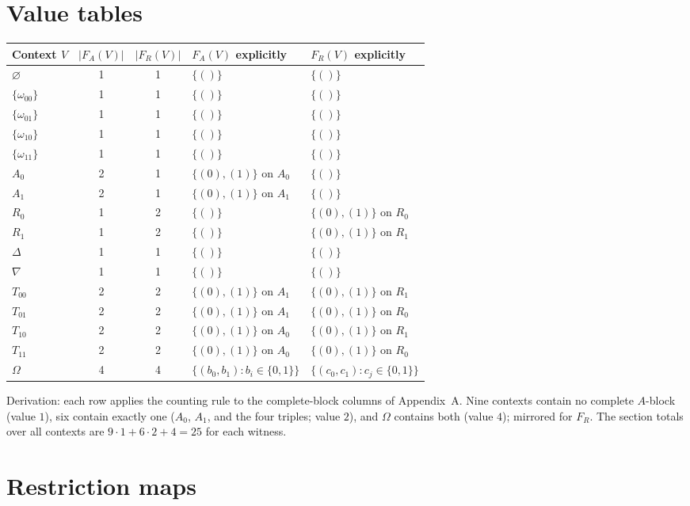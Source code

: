\section{Value tables}
\label{appC:sec:values}

\begin{longtable}{@{}lccll@{}}
\toprule
Context $V$ & $|F_A(V)|$ & $|F_R(V)|$ & $F_A(V)$ explicitly &
$F_R(V)$ explicitly \\
\midrule
\endhead
\bottomrule
\endfoot
$\varnothing$ & 1 & 1 & $\{()\}$ & $\{()\}$ \\
$\{\omega_{00}\}$ & 1 & 1 & $\{()\}$ & $\{()\}$ \\
$\{\omega_{01}\}$ & 1 & 1 & $\{()\}$ & $\{()\}$ \\
$\{\omega_{10}\}$ & 1 & 1 & $\{()\}$ & $\{()\}$ \\
$\{\omega_{11}\}$ & 1 & 1 & $\{()\}$ & $\{()\}$ \\
$A_0$ & 2 & 1 & $\{(0), (1)\}$ on $A_0$ & $\{()\}$ \\
$A_1$ & 2 & 1 & $\{(0), (1)\}$ on $A_1$ & $\{()\}$ \\
$R_0$ & 1 & 2 & $\{()\}$ & $\{(0), (1)\}$ on $R_0$ \\
$R_1$ & 1 & 2 & $\{()\}$ & $\{(0), (1)\}$ on $R_1$ \\
$\Delta$ & 1 & 1 & $\{()\}$ & $\{()\}$ \\
$\nabla$ & 1 & 1 & $\{()\}$ & $\{()\}$ \\
$T_{00}$ & 2 & 2 & $\{(0), (1)\}$ on $A_1$ & $\{(0), (1)\}$ on $R_1$ \\
$T_{01}$ & 2 & 2 & $\{(0), (1)\}$ on $A_1$ & $\{(0), (1)\}$ on $R_0$ \\
$T_{10}$ & 2 & 2 & $\{(0), (1)\}$ on $A_0$ & $\{(0), (1)\}$ on $R_1$ \\
$T_{11}$ & 2 & 2 & $\{(0), (1)\}$ on $A_0$ & $\{(0), (1)\}$ on $R_0$ \\
$\Omega$ & 4 & 4 & $\{(b_0, b_1) : b_i \in \{0,1\}\}$ &
$\{(c_0, c_1) : c_j \in \{0,1\}\}$ \\
\end{longtable}

Derivation: each row applies the counting rule to the complete-block
columns of Appendix~A. Nine contexts contain no complete $A$-block
(value $1$), six contain exactly one ($A_0$, $A_1$, and the four
triples; value $2$), and $\Omega$ contains both (value $4$); mirrored
for $F_R$. The section totals over all contexts are
$9 \cdot 1 + 6 \cdot 2 + 4 = 25$ for each witness.

\section{Restriction maps}
\label{appC:sec:restrictions}

